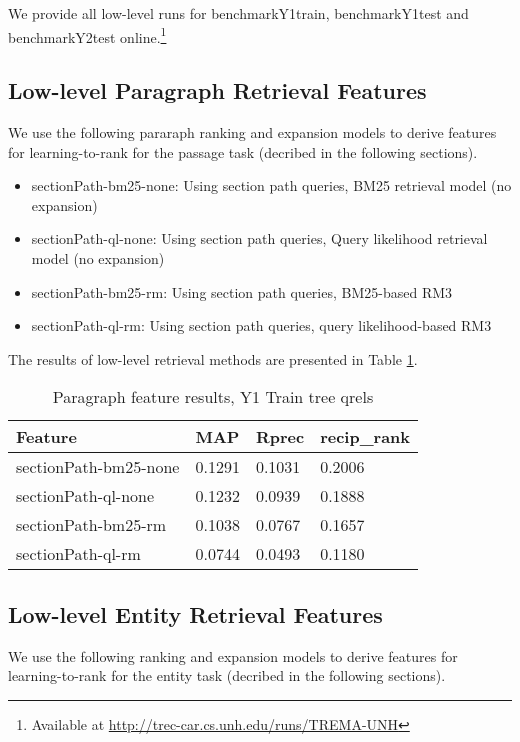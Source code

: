 \documentclass{article}
\begin{document}
We provide all low-level runs for benchmarkY1train, benchmarkY1test and benchmarkY2test online.\footnote{Available at \url{http://trec-car.cs.unh.edu/runs/TREMA-UNH}} 


\subsection{Low-level Paragraph Retrieval Features}\label{sec:para}

We  use the following pararaph ranking and expansion models to derive features for  learning-to-rank for the passage task (decribed in the following sections).
\begin{itemize}
    \item sectionPath-bm25-none: Using section path queries, BM25 retrieval model (no expansion) 
    \item sectionPath-ql-none: Using section path queries, Query likelihood retrieval model (no expansion)
    \item sectionPath-bm25-rm: Using section path queries, BM25-based RM3
    \item sectionPath-ql-rm: Using section path queries, query likelihood-based RM3
\end{itemize}

The results of low-level retrieval methods are presented in Table \ref{tab:para}.

\begin{table}[tb]
\centering
\begin{tabular}{l l l l}
\hline
\textbf{Feature} & \textbf{MAP} & \textbf{Rprec} & \textbf{recip\_rank}\\
\hline
sectionPath-bm25-none & 0.1291 & 0.1031 & 0.2006 \\
sectionPath-ql-none & 0.1232 & 0.0939 & 0.1888 \\
sectionPath-bm25-rm & 0.1038 & 0.0767 & 0.1657 \\
sectionPath-ql-rm & 0.0744 & 0.0493 & 0.1180 \\
\hline
\end{tabular}
\caption{Paragraph feature results, Y1 Train tree qrels}\label{tab:para}
\end{table}

\subsection{Low-level Entity Retrieval Features}
\label{sec:entity}


We  use the following ranking and expansion models to derive features for  learning-to-rank for the entity task (decribed in the following sections).
\end{document}
